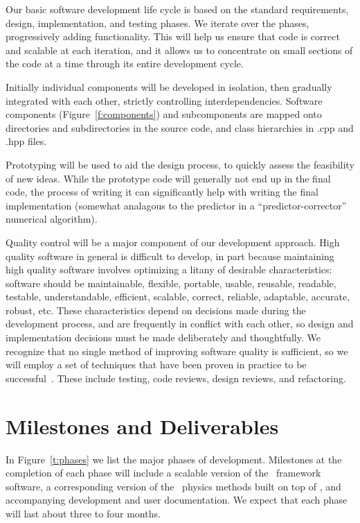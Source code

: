 \documentclass[10pt,twocolumn]{article}
\begin{document}
Our basic software development life cycle is based on the standard
requirements, design, implementation, and testing phases.  We iterate
over the phases, progressively adding functionality.  This will help
us ensure that code is correct and scalable at each iteration, and it
allows us to concentrate on small sections of the code at a time
through its entire development cycle.  

Initially individual components will be developed in isolation, then
gradually integrated with each other, strictly controlling
interdependencies.  Software components (Figure~\ref{f:components})
and subcomponents are mapped onto directories and subdirectories in
the source code, and class hierarchies in .cpp and .hpp files.

Prototyping will be used to aid the design process, to quickly assess
the feasibility of new ideas.  While the prototype code will generally
not end up in the final code, the process of writing it can
significantly help with writing the final implementation (somewhat
analagous to the predictor in a ``predictor-corrector'' numerical
algorithm).

Quality control will be a major component of our development approach.
High quality software in general is difficult to develop, in part
because maintaining high quality software involves optimizing a litany
of desirable characteristics: software should be maintainable,
flexible, portable, usable, reusable, readable, testable,
understandable, efficient, scalable, correct, reliable, adaptable,
accurate, robust, etc.  These characteristics depend on decisions made
during the development process, and are frequently in conflict with
each other, so design and implementation decisions must be made
deliberately and thoughtfully.  We recognize that no single method of
improving software quality is sufficient, so we will employ a set of
techniques that have been proven in practice to be
successful~\cite{Mc04}.  These include testing, code reviews, design
reviews, and refactoring.



\section{Milestones and Deliverables} \label{s:milestones}

In Figure~\ref{t:phases} we list the major phases of development.
Milestones at the completion of each phase will include a scalable
version of the \cello\ framework software, a corresponding version of
the \enzoii\ physics methods built on top of \cello, and accompanying
development and user documentation.  We expect that each phase will
last about three to four months.
\end{document}
